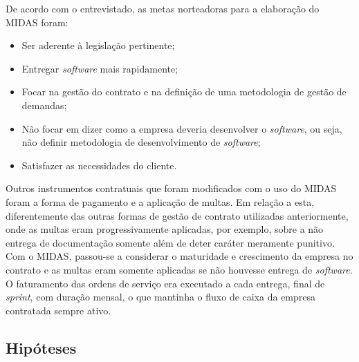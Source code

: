 De acordo com o entrevistado, as metas norteadoras para a elaboração do MIDAS foram:
\begin{itemize}
\item Ser aderente à legislação pertinente;
\item Entregar \textit{software} mais rapidamente;
\item Focar na gestão do contrato e na definição de uma metodologia de gestão de demandas;
\item Não focar em dizer como a empresa deveria desenvolver o \textit{software}, ou seja, não definir metodologia de desenvolvimento de \textit{software};
\item Satisfazer as necessidades do cliente.
\end{itemize}

Outros instrumentos contratuais que foram modificados com o uso do MIDAS foram a forma de pagamento e a aplicação de multas. Em relação a esta, diferentemente das outras formas de gestão de contrato utilizadas anteriormente, onde as multas eram progressivamente aplicadas, por exemplo, sobre a não entrega de documentação somente além de deter caráter meramente punitivo. Com o MIDAS, passou-se a considerar o maturidade e crescimento da empresa no contrato e as multas eram somente aplicadas se não houvesse entrega de \textit{software}. O faturamento das ordens de serviço era executado a cada entrega, final de \textit{sprint}, com duração mensal, o que mantinha o fluxo de caixa da empresa contratada sempre ativo.

\subsection[Hipóteses]{Hipóteses}

